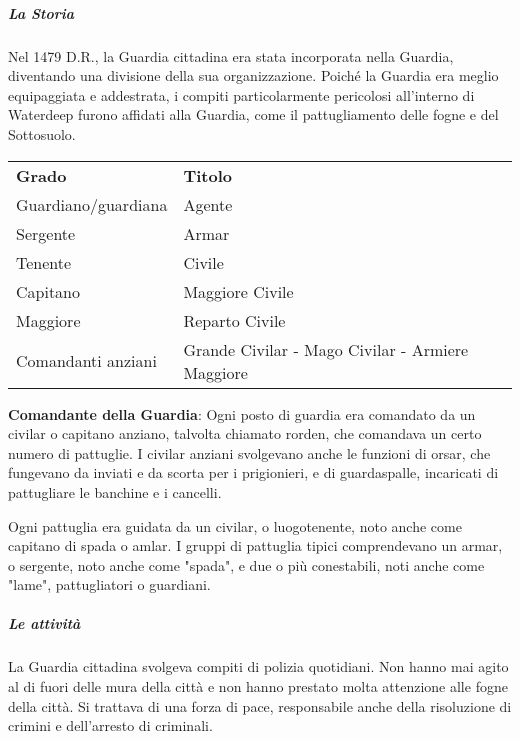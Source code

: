 \documentclass{article}
\begin{document}
\subparagraph{La Storia}
Nel 1479 D.R., la Guardia cittadina era stata incorporata nella Guardia, diventando una divisione della sua organizzazione. Poiché la Guardia era meglio equipaggiata e addestrata, i compiti particolarmente pericolosi all'interno di Waterdeep furono affidati alla Guardia, come il pattugliamento delle fogne e del Sottosuolo.
                        \begin{center}
                          \begin{tabular}{ll}
                         
                          \textbf{Grado} & \textbf{Titolo} \\
                         
                          Guardiano/guardiana & Agente \\
                          Sergente & Armar \\
                          Tenente & Civile \\
                          Capitano & Maggiore Civile \\
                          Maggiore & Reparto Civile \\
                          Comandanti anziani & Grande Civilar - Mago Civilar - Armiere Maggiore \\
                         
                          \end{tabular}
                          \end{center}
                          
                          \textbf{Comandante della Guardia}: Ogni posto di guardia era comandato da un civilar o capitano anziano, talvolta chiamato rorden, che comandava un certo numero di pattuglie. I civilar anziani svolgevano anche le funzioni di orsar, che fungevano da inviati e da scorta per i prigionieri, e di guardaspalle, incaricati di pattugliare le banchine e i cancelli.
                          
                          Ogni pattuglia era guidata da un civilar, o luogotenente, noto anche come capitano di spada o amlar. I gruppi di pattuglia tipici comprendevano un armar, o sergente, noto anche come "spada", e due o più conestabili, noti anche come "lame", pattugliatori o guardiani.
                          \subparagraph{Le attività}
                          La Guardia cittadina svolgeva compiti di polizia quotidiani. Non hanno mai agito al di fuori delle mura della città e non hanno prestato molta attenzione alle fogne della città. Si trattava di una forza di pace, responsabile anche della risoluzione di crimini e dell'arresto di criminali.
                          
\end{document}

